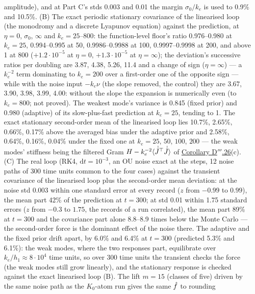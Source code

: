 \begin{sloppypar}
amplitude), and at Part C's stds 0.003 and 0.01 the margin $\sigma_0/k_e$ is used to 0.9\% and 10.5\%. (B) The exact
periodic stationary covariance of the linearised loop (the monodromy and a discrete Lyapunov equation) against the
prediction, at $\eta = 0$, $\sigma_0$, $\infty$ and $k_e = 25$--$800$: the function-level floor's ratio 0.976--0.980
at $k_e = 25$, 0.994--0.995 at 50, 0.9986--0.9988 at 100, 0.9997--0.9998 at 200, and above 1 at 800
($+1.2\cdot10^{-5}$ at $\eta = 0$, $+1.3\cdot10^{-5}$ at $\eta = \infty$); the deviation's successive ratios per
doubling are 3.87, 4.38, 5.26, 11.4 and a change of sign ($\eta = \infty$) --- a $k_e^{-2}$ term dominating to
$k_e = 200$ over a first-order one of the opposite sign --- while with the noise input $-k_e\nu$ (the slope removed,
the control) they are 3.67, 3.90, 3.98, 3.99, 4.00: without the slope the expansion is numerically even (to
$k_e = 800$; not proved). The weakest mode's variance is 0.845 (fixed prior) and 0.980 (adaptive) of its
slow-plus-fast prediction at $k_e = 25$, tending to 1. The exact stationary second-order mean of the linearised loop
lies 10.7\%, 2.65\%, 0.66\%, 0.17\% above the averaged bias under the adaptive prior and 2.58\%, 0.64\%, 0.16\%,
0.04\% under the fixed one at $k_e = 25$, $50$, $100$, $200$ --- the weak modes' stiffness being the filtered Gram
$H - k_e^{-2}\langle\dot{\hat J}^\top\dot{\hat J}\rangle$ of \hyperref[res:thmDppp:26]{Corollary D$'''$.26}(c). (C) The
real loop (RK4, $\mathrm{d}t = 10^{-3}$, an OU noise exact at the steps, 12 noise paths of 300 time units common to the
four cases) against the transient covariance of the linearised loop plus the second-order mean deviation: at the noise
std 0.003 within one standard error at every record ($z$ from $-0.99$ to $0.99$), the mean part 42\% of the
prediction at $t = 300$; at std 0.01 within 1.75 standard errors ($z$ from $-0.3$ to $1.75$, the records of a run
correlated), the mean part 89\% at $t = 300$ and the covariance part alone 8.8--8.9 times below the Monte Carlo ---
the second-order force is the dominant effect of the noise there. The adaptive and the fixed prior drift apart, by
6.0\% and 6.4\% at $t = 300$ (predicted 5.3\% and 6.1\%): the weak modes, where the two responses part, equilibrate
over $k_e/h_1\approx8\cdot10^4$ time units, so over 300 time units the transient checks the force (the weak modes
still grow linearly), and the stationary response is checked against the exact linearised loop (B). The lift
$m = 15$ (classes of five) driven by the same noise path as the $K_0$-atom run gives the same $\hat f$ to rounding

\end{sloppypar}
